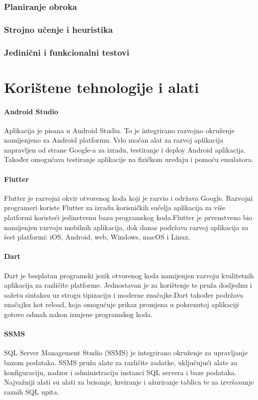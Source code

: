 \documentclass[diplomskirad]{fer}
\begin{document}
\subsection{Planiranje obroka}
\subsection{Strojno učenje i heuristika}
\subsection{Jedinični i funkcionalni testovi}

\chapter{Korištene tehnologije i alati}
\subsubsection{Android Studio} 
Aplikacija je pisana u Android Studiu. To je integrirano razvojno okruženje namijenjeno za Android platformu. Vrlo moćan alat za razvoj aplikacija napravljen od strane Google-a za izradu, testiranje i deploy Android aplikacija. Također omogućava testiranje aplikacije na fizičkom uređaju i pomoću emulatora. \cite{AndroidStudio}
\subsubsection{Flutter}
Flutter je razvojni okvir otvorenog koda koji je razvio i održava Google. Razvojni programeri koriste Flutter za izradu korisničkih sučelja aplikacija za više platformi koristeći jedinstvenu bazu programskog koda.Flutter je prvenstveno bio namijenjen razvoju mobilnih aplikacija, dok danas podržava razvoj aplikacija za šest platformi: iOS, Android, web, Windows, macOS i Linux. \cite{Flutter}
\subsubsection{Dart}
Dart je besplatan programski jezik otvorenog koda namijenjen razvoju kvalitetnih aplikacija za različite platforme. Jednostavan je za korištenje te pruža dosljednu i sažetu sintaksu uz strogu tipizaciju i moderne značajke.Dart također podržava značajku hot reload, koja omogućuje prikaz promjena u pokrenutoj aplikaciji gotovo odmah nakon izmjene programskog koda.
\cite{Dart}
\subsubsection{SSMS}
SQL Server Management Studio (SSMS) je integrirano okruženje za upravljanje bazom podataka. SSMS pruža alate za različite zadatke, uključujući alate za konfiguraciju, nadzor i administraciju instanci SQL servera i baze podataka. Najvažniji alati su alati za brisanje, kreiranje i ažuriranje tablica te za izvršavanje raznih SQL upita. \cite{SSMS}
\end{document}
